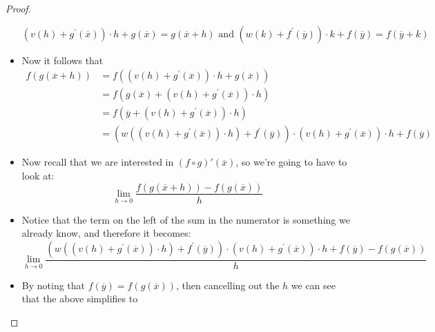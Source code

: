 \begin{proof}
\begin{itemize}
            \[
            \left( v\left( h \right) +  g ^{ \prime } \left( \overline{x}  \right)  \right) \cdot h +  g\left( \overline{x}  \right) = g\left( \overline{x} + h \right) \text{ and } \left( w\left( k \right) +  f ^{ \prime } \left( \overline{y}  \right)  \right) \cdot k +  f\left( \overline{y}  \right) = f\left( \overline{y} + k \right) 
            \]
        \item Now it follows that
            \begin{align*}
                f\left( g\left( \overline{x} + h \right)  \right) &= f\left( \left( v\left( h \right) +  g ^{ \prime } \left( \overline{x}  \right)  \right) \cdot h +  g\left( \overline{x}  \right) \right) \\
&= f\left(g\left( \overline{x}  \right) + \left(    v\left( h \right) +  g ^{ \prime } \left( \overline{x}  \right)  \right) \cdot h  \right) \\
&= f\left( \overline{y}  + \left(    v\left( h \right) +  g ^{ \prime } \left( \overline{x}  \right)  \right) \cdot h  \right) \\
&= \left( w\left( \left(    v\left( h \right) +  g ^{ \prime } \left( \overline{x}  \right)  \right) \cdot h \right) +  f ^{ \prime } \left( \overline{y}  \right)  \right) \cdot \left(    v\left( h \right) +  g ^{ \prime } \left( \overline{x}  \right)  \right) \cdot h +  f\left( \overline{y}  \right)
            \end{align*}
        \item Now recall that we are interested in $ \left( f \circ g \right)' \left( \overline{x}  \right) $, so we're going to have to look at:
            \[
            \lim_{ h \to 0 } \frac{f\left( g\left( \overline{x} +  h \right)  \right)-  f\left( g\left( \overline{x}  \right)  \right)   }{h}
            \]
        \item Notice that the term on the left of the sum in the numerator is something we already know, and therefore it becomes:
        \[
        \lim_{ h \to 0 } \frac{\left( w\left( \left(    v\left( h \right) +  g ^{ \prime } \left( \overline{x}  \right)  \right) \cdot h \right) +  f ^{ \prime } \left( \overline{y}  \right)  \right) \cdot \left(    v\left( h \right) +  g ^{ \prime } \left( \overline{x}  \right)  \right) \cdot h +  f\left( \overline{y}  \right)-  f\left( g\left( \overline{x}  \right)  \right)   }{h}
        \]
        \item By noting that $ f\left( \overline{y}  \right) = f\left( g\left( \overline{x}  \right)  \right)  $, then cancelling out the $ h $ we can see that the above simplifies to 

\end{itemize}
\end{proof}
